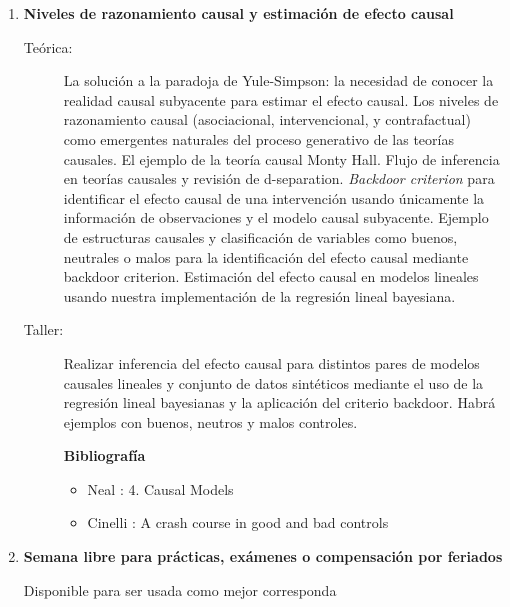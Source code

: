 \documentclass[11pt]{article}
\begin{document}
\begin{enumerate}
\item \textbf{Niveles de razonamiento causal y estimación de efecto causal}
\vspace{-0.15cm}
\begin{description}
\item[Teórica:] La solución a la paradoja de Yule-Simpson: la necesidad de conocer la realidad causal subyacente para estimar el efecto causal.
Los niveles de razonamiento causal (asociacional, intervencional, y contrafactual) como emergentes naturales del proceso generativo de las teorías causales.
El ejemplo de la teoría causal Monty Hall.
Flujo de inferencia en teorías causales y revisión de d-separation.
\emph{Backdoor criterion} para identificar el efecto causal de una intervención usando únicamente la información de observaciones y el modelo causal subyacente.
Ejemplo de estructuras causales y clasificación de variables como buenos, neutrales o malos para la identificación del efecto causal mediante backdoor criterion.
Estimación del efecto causal en modelos lineales usando nuestra implementación de la regresión lineal bayesiana.
\item[Taller:] Realizar inferencia del efecto causal para distintos pares de modelos causales lineales y conjunto de datos sintéticos mediante el uso de la regresión lineal bayesianas y la aplicación del criterio backdoor.
Habrá ejemplos con buenos, neutros y malos controles.
\item[] \textbf{Bibliografía}
\begin{itemize}
\item Neal \cite{neal2020}: 4. Causal Models
\item Cinelli \cite{cinelli2022-controls}: A crash course in good and bad controls
\end{itemize}
\end{description}



\item \textbf{Semana libre para prácticas, exámenes o compensación por feriados}
\vspace{-0.15cm}
\begin{description}
\item[Disponible para ser usada como mejor corresponda]
\end{description}


\end{enumerate}
\end{document}
